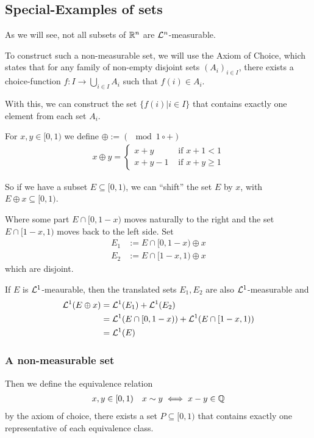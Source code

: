 \subsection{Special-Examples of sets}

As we will see, not all subsets of $\mathbb{R}^{n}$ are $\mathcal{L}^{n}$-measurable.

To construct such a non-measurable set, we will use the Axiom of Choice, which states that for any family of non-empty disjoint sets $(A_i)_{i \in I}$, there exists a choice-function $f: I \to \bigcup_{i \in I} A_i$ such that $f(i) \in A_i$.

With this, we can construct the set $\{f(i) \big\vert i \in I\}$ that contains exactly one element from each set $A_i$.

For $x,y \in [0,1)$ we define $\oplus := (\mod 1 \circ +)$
\begin{align*}
  x \oplus y = \left\{\begin{array}{ll}
    x+y & \text{ if } x + 1 < 1\\
    x + y - 1 & \text{ if } x + y \geq 1
  \end{array} \right.
\end{align*}


So if we have a subset $E \subseteq [0,1)$, we can ``shift'' the set $E$ by $x$, with $E \oplus x \subseteq [0,1)$.

Where some part $E \cap  [0,1-x)$ moves naturally to the right and the set $E \cap [1-x,1)$ moves back to the left side. 
Set
\begin{align*}
  E_1 &:= E \cap [0,1-x) \oplus x\\
  E_2 &:= E \cap [1-x,1) \oplus x
\end{align*}
which are disjoint.

If $E$ is $\mathcal{L}^{1}$-meaurable, then the translated sets $E_1,E_2$ are also $\mathcal{L}^{1}$-measurable and 
\begin{align*}
  \mathcal{L}^{1}(E \oplus x) 
  &= \mathcal{L}^{1}(E_1) + \mathcal{L}^{1}(E_2)\\
  &= \mathcal{L}^{1}(E \cap [0,1-x)) + \mathcal{L}^{1}(E \cap [1-x,1))\\
  &= \mathcal{L}^{1}(E)
\end{align*}


\subsubsection*{A non-measurable set}
Then we define the equivalence relation
\begin{align*}
  x,y \in [0,1) \quad x \sim y \iff x-y \in \mathbb{Q}
\end{align*}
by the axiom of choice, there exists a set $P \subseteq [0,1)$ that contains exactly one representative of each equivalence class.

